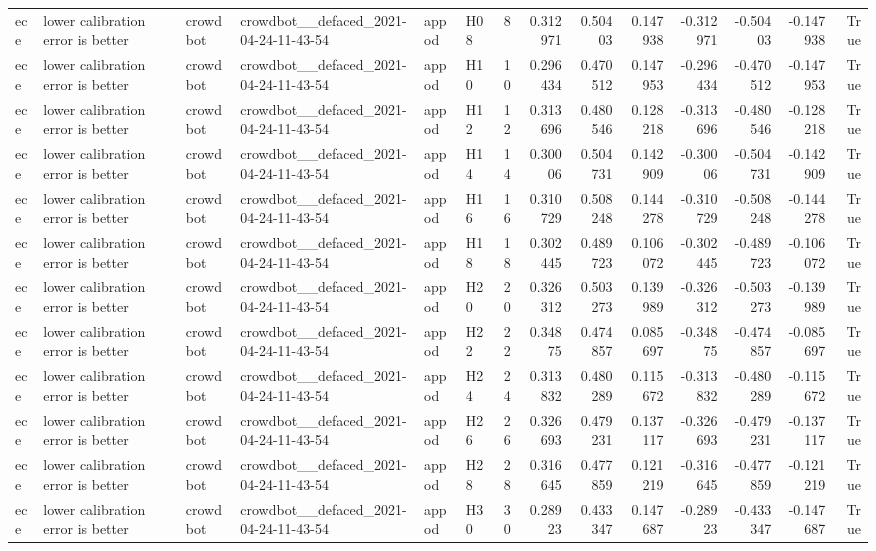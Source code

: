 \begin{longtable}{llllllrrrrrrrr}
ece & lower calibration error is better & crowdbot & crowdbot\_\_defaced\_2021-04-24-11-43-54 & appod & H08 & 8 & 0.312971 & 0.50403 & 0.147938 & -0.312971 & -0.50403 & -0.147938 & True \\
ece & lower calibration error is better & crowdbot & crowdbot\_\_defaced\_2021-04-24-11-43-54 & appod & H10 & 10 & 0.296434 & 0.470512 & 0.147953 & -0.296434 & -0.470512 & -0.147953 & True \\
ece & lower calibration error is better & crowdbot & crowdbot\_\_defaced\_2021-04-24-11-43-54 & appod & H12 & 12 & 0.313696 & 0.480546 & 0.128218 & -0.313696 & -0.480546 & -0.128218 & True \\
ece & lower calibration error is better & crowdbot & crowdbot\_\_defaced\_2021-04-24-11-43-54 & appod & H14 & 14 & 0.30006 & 0.504731 & 0.142909 & -0.30006 & -0.504731 & -0.142909 & True \\
ece & lower calibration error is better & crowdbot & crowdbot\_\_defaced\_2021-04-24-11-43-54 & appod & H16 & 16 & 0.310729 & 0.508248 & 0.144278 & -0.310729 & -0.508248 & -0.144278 & True \\
ece & lower calibration error is better & crowdbot & crowdbot\_\_defaced\_2021-04-24-11-43-54 & appod & H18 & 18 & 0.302445 & 0.489723 & 0.106072 & -0.302445 & -0.489723 & -0.106072 & True \\
ece & lower calibration error is better & crowdbot & crowdbot\_\_defaced\_2021-04-24-11-43-54 & appod & H20 & 20 & 0.326312 & 0.503273 & 0.139989 & -0.326312 & -0.503273 & -0.139989 & True \\
ece & lower calibration error is better & crowdbot & crowdbot\_\_defaced\_2021-04-24-11-43-54 & appod & H22 & 22 & 0.34875 & 0.474857 & 0.085697 & -0.34875 & -0.474857 & -0.085697 & True \\
ece & lower calibration error is better & crowdbot & crowdbot\_\_defaced\_2021-04-24-11-43-54 & appod & H24 & 24 & 0.313832 & 0.480289 & 0.115672 & -0.313832 & -0.480289 & -0.115672 & True \\
ece & lower calibration error is better & crowdbot & crowdbot\_\_defaced\_2021-04-24-11-43-54 & appod & H26 & 26 & 0.326693 & 0.479231 & 0.137117 & -0.326693 & -0.479231 & -0.137117 & True \\
ece & lower calibration error is better & crowdbot & crowdbot\_\_defaced\_2021-04-24-11-43-54 & appod & H28 & 28 & 0.316645 & 0.477859 & 0.121219 & -0.316645 & -0.477859 & -0.121219 & True \\
ece & lower calibration error is better & crowdbot & crowdbot\_\_defaced\_2021-04-24-11-43-54 & appod & H30 & 30 & 0.28923 & 0.433347 & 0.147687 & -0.28923 & -0.433347 & -0.147687 & True \\

\end{longtable}
